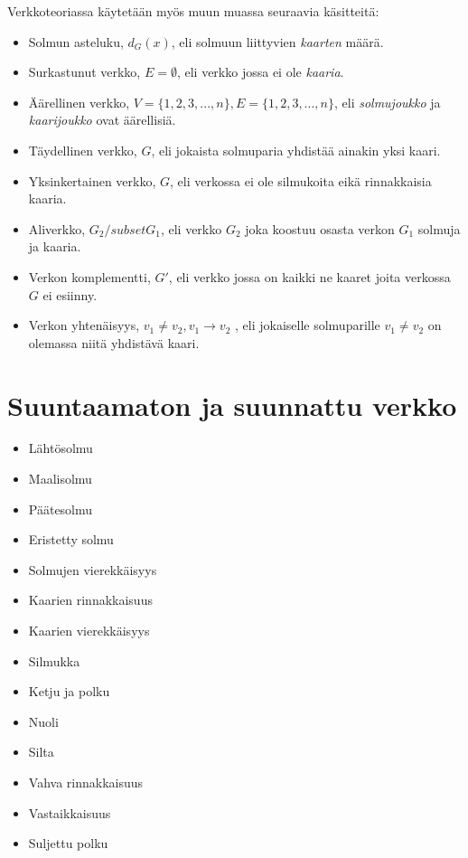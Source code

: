 Verkkoteoriassa käytetään myös muun muassa seuraavia käsitteitä:
\begin{itemize}
  \item Solmun asteluku, \(d_G(x)\), eli solmuun liittyvien \emph{kaarten} määrä.
  \item Surkastunut verkko, \(E = \emptyset\), eli verkko jossa ei ole \emph{kaaria}.
  \item Äärellinen verkko, \(V = \{1,2,3,...,n\}, E = \{1,2,3,...,n\} \), eli \emph{solmujoukko} ja \emph{kaarijoukko} ovat äärellisiä.
  \item Täydellinen verkko, \(G\), eli jokaista solmuparia yhdistää ainakin yksi kaari.
  \item Yksinkertainen verkko, \(G\), eli verkossa ei ole silmukoita eikä rinnakkaisia kaaria.
  \item Aliverkko, \(G_2 /subset G_1\), eli verkko \(G_2\) joka koostuu osasta verkon \(G_1\) solmuja ja kaaria.
  \item Verkon komplementti, \(G'\), eli verkko jossa on kaikki ne kaaret joita verkossa \(G\) ei esiinny.
  \item Verkon yhtenäisyys, \(v_1 \neq v_2, v_1 \rightarrow v_2\) , eli jokaiselle solmuparille \(v_1 \neq v_2\) on olemassa niitä yhdistävä kaari.
\end{itemize}

\section{Suuntaamaton ja suunnattu verkko}

\begin{itemize}
  \item Lähtösolmu
  \item Maalisolmu
  \item Päätesolmu
  \item Eristetty solmu
  \item Solmujen vierekkäisyys
  \item Kaarien rinnakkaisuus
  \item Kaarien vierekkäisyys
  \item Silmukka
  \item Ketju ja polku
  \item Nuoli
  \item Silta
  \item Vahva rinnakkaisuus
  \item Vastaikkaisuus
  \item Suljettu polku
\end{itemize}

